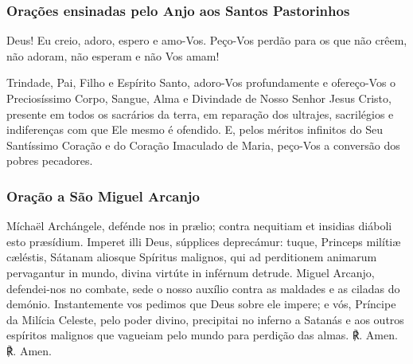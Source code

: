 \subsubsection{Orações ensinadas pelo Anjo aos Santos Pastorinhos}
\begin{nscenter}
{}
\end{nscenter}

 Deus! Eu creio, adoro, espero e amo-Vos. Peço-Vos perdão para os que não crêem, não adoram, não esperam e não Vos amam!

\emph{}

\begin{nscenter}
{}
\end{nscenter}

 Trindade, Pai, Filho e Espírito Santo, adoro-Vos profundamente e ofereço-Vos o Preciosíssimo Corpo, Sangue, Alma e Divindade de Nosso Senhor Jesus Cristo, presente em todos os sacrários da terra, em reparação dos ultrajes, sacrilégios e indiferenças com que Ele mesmo é ofendido. E, pelos méritos infinitos do Seu Santíssimo Coração e do Coração Imaculado de Maria, peço-Vos a conversão dos pobres pecadores.

\emph{}

\subsubsection{Oração a São Miguel Arcanjo}
\begin{paracol}{2}
 Míchaël Archángele, defénde nos in prælio; contra nequitiam et insidias diáboli esto præsídium. Imperet illi Deus, súpplices deprecámur: tuque, Princeps milítiæ cæléstis, Sátanam aliosque Spíritus malignos, qui ad perditionem animarum pervagantur in mundo, divina virtúte in inférnum detrude.
\switchcolumn
{} Miguel Arcanjo, defendei-nos no combate, sede o nosso auxílio contra as maldades e as ciladas do demónio. Instantemente vos pedimos que Deus sobre ele impere; e vós, Príncipe da Milícia Celeste, pelo poder divino, precipitai no inferno a Satanás e aos outros espíritos malignos que vagueiam pelo mundo para perdição das almas.
\switchcolumn*
℟. Amen.
\switchcolumn
℟. Amen.
\end{paracol}

